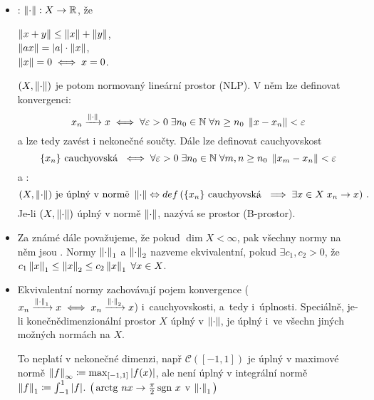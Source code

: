 \begin{itemize}
    \item {}: \hspace{1em}
    $\left\lVert\cdot\right\rVert: X \to \mathbb{R}$, že \parbox[t]{20em}{
        $\left\lVert x+y\right\rVert \leq \left\lVert x\right\rVert + \left\lVert y\right\rVert$, \\[3pt]
        $\left\lVert ax\right\rVert = |a| \cdot \left\lVert x\right\rVert$, \\[3pt]
        $\left\lVert x\right\rVert = 0 \iff x = 0$.
    }
    
    $(X, \left\lVert\cdot\right\rVert)$ je potom normovaný lineární prostor (NLP). V něm lze definovat konvergenci:
    $$
        x_n \xrightarrow{\left\lVert\cdot\right\rVert} x
        \iff
        \forall \varepsilon > 0 \;
        \exists n_0 \in \mathbb{N} \;
        \forall n \geq n_0 \;
        \left\lVert x - x_n\right\rVert < \varepsilon
    $$
    a lze tedy zavést i nekonečné součty.
    Dále lze definovat cauchyovskost
    $$
        \{ x_n \} \text{ cauchyovská }
        \iff
        \forall \varepsilon > 0 \;
        \exists n_0 \in \mathbb{N} \;
        \forall m,n \geq n_0 \;
        \left\lVert x_m - x_n\right\rVert < \varepsilon
    $$
    a :
    $$
        (X, \left\lVert\cdot\right\rVert) \text{ je úplný v normě } \left\lVert\cdot\right\rVert
        \Leftrightarrow{def}
        \left(
        \{ x_n \} \text{ cauchyovská }
        \implies
        \exists x \in X \; x_n \to x
        \right)\,.
    $$
    Je-li $(X, \left\lVert\cdot\right\rVert)$ úplný v normě $\left\lVert\cdot\right\rVert$, nazývá se  prostor (B-prostor).
    
    \item Za známé dále považujeme, že pokud $\dim X < \infty$, pak všechny normy na něm jsou . Normy $\left\lVert\cdot\right\rVert_1$ a $\left\lVert\cdot\right\rVert_2$ nazveme ekvivalentní, pokud $\exists c_1, c_2 > 0$, že
    $c_1 \left\lVert x\right\rVert_1 \leq \left\lVert x\right\rVert_2 \leq c_2 \left\lVert x\right\rVert_1 \; \forall x \in X$.
    
    \item Ekvivalentní normy zachovávají pojem konvergence ($x_n \xrightarrow{\left\lVert\cdot\right\rVert_1} x \iff x_n \xrightarrow{\left\lVert\cdot\right\rVert_2} x$) i~cauchyovskosti, a~tedy i~úplnosti. Speciálně, je-li konečnědimenzionální prostor $X$ úplný v $\left\lVert\cdot\right\rVert$, je úplný i~ve všechn jiných možných normách na $X$.
    
    To neplatí v nekonečné dimenzi, např $\mathcal{C}([-1, 1])$ je úplný v maximové normě $\left\lVert f\right\rVert_\infty \coloneqq \max_{[-1, 1]} |f(x)|$, ale není úplný v integrální normě $\left\lVert f\right\rVert_1 \coloneqq \int_{-1}^1 |f|$. $\big(\operatorname{arctg}\, nx \to \frac{\pi}{2} \operatorname{sgn}\, x$ v $\left\lVert\cdot\right\rVert_1\big)$
    

\end{itemize}
